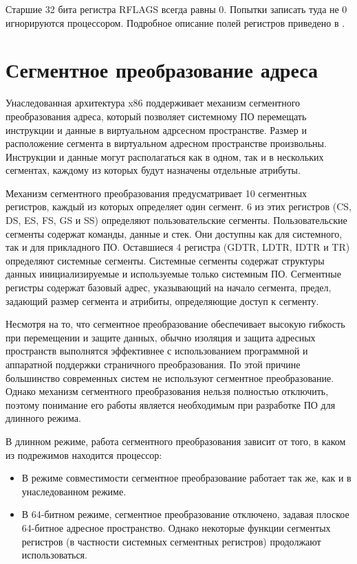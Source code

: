 Старшие 32 бита регистра RFLAGS всегда равны 0. Попытки записать туда не 0 игнорируются процессором.
Подробное описание полей регистров приведено в \cite[стр. 42]{amd_pm_v2}.

\section{Сегментное преобразование адреса}
Унаследованная архитектура x86 поддерживает механизм сегментного преобразования адреса, который
позволяет системному ПО перемещать инструкции и данные в виртуальном адрсесном пространстве.
Размер и расположение сегмента в виртуальном адресном пространстве произвольны. Инструкции и данные
могут располагаться как в одном, так и в нескольких сегментах, каждому из которых будут назначены
отдельные атрибуты.

Механизм сегментного преобразования предусматривает 10 сегментных регистров, каждый из которых
определяет один сегмент. 6 из этих регистров (CS, DS, ES, FS, GS и SS) определяют пользовательские сегменты.
Пользовательские сегменты содержат команды, данные и стек. Они доступны как для системного, так и для прикладного ПО.
Оставшиеся 4 регистра (GDTR, LDTR, IDTR и TR) определяют системные сегменты. Системные сегменты содержат структуры
данных инициализируемые и используемые только системным ПО. Сегментные регистры содержат базовый адрес, указывающий
на начало сегмента, предел, задающий размер сегмента и атрибиты, определяющие доступ к сегменту.

Несмотря на то, что сегментное преобразование обеспечивает высокую гибкость при перемещении и защите данных,
обычно изоляция и защита адресных пространств выполнятся эффективнее с использованием программной и аппаратной
поддержки страничного преобразования. По этой причине большинство современных систем не используют сегментное преобразование.
Однако механизм сегментного преобразования нельзя полностью отключить, поэтому понимание его работы
является необходимым при разработке ПО для длинного режима.

В длинном режиме, работа сегментного преобразования зависит от того, в каком из подрежимов находится процессор:
\begin{itemize}
\item В режиме совместимости сегментное преобразование работает так же, как и в унаследованном режиме.
\item В 64-битном режиме, сегментное преобразование отключено, задавая плоское 64-битное адресное пространство.
	Однако некоторые функции сегментых регистров (в частности системных сегментных регистров) продолжают использоваться.
\end{itemize}

